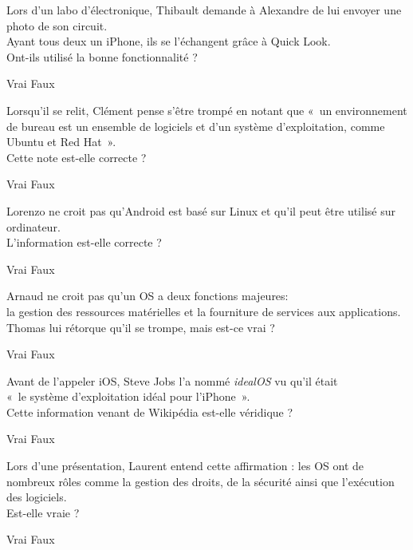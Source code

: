 \documentclass[12pt, a4paper]{exam}
\begin{document}
\begin{questions}
    \question Lors d’un labo d’électronique, Thibault demande à Alexandre de lui
    envoyer une photo de son circuit. \\
    Ayant tous deux un iPhone, ils se l’échangent grâce à Quick Look. \\
    Ont-ils utilisé la bonne fonctionnalité ?
    \begin{checkboxes}
      \choice Vrai
      \choice Faux
    \end{checkboxes}

    \clearpage

    \question Lorsqu’il se relit, Clément pense s’être trompé en notant que « un
    environnement de bureau est un ensemble de logiciels et d’un système
    d’exploitation, comme Ubuntu et Red Hat ». \\
    Cette note est-elle correcte ?
    \begin{checkboxes}
      \choice Vrai
      \choice Faux
    \end{checkboxes}

    \question Lorenzo ne croit pas qu’Android est basé sur Linux et qu’il peut
    être utilisé sur ordinateur. \\
    L’information est-elle correcte ?
    \begin{checkboxes}
      \choice Vrai
      \choice Faux
    \end{checkboxes}

    \question Arnaud ne croit pas qu’un OS a deux fonctions majeures: \\
    la gestion des ressources matérielles et la fourniture de services aux
    applications. \\
    Thomas lui rétorque qu’il se trompe, mais est-ce vrai ?
    \begin{checkboxes}
      \choice Vrai
      \choice Faux
    \end{checkboxes}

    \question Avant de l’appeler iOS, Steve Jobs l’a nommé \textit{idealOS} vu
    qu’il était \\« le système d’exploitation idéal pour l’iPhone ». \\
    Cette information venant de Wikipédia est-elle véridique ?
    \begin{checkboxes}
      \choice Vrai
      \choice Faux
    \end{checkboxes}

    \question Lors d’une présentation, Laurent entend cette affirmation : les OS
    ont de nombreux rôles comme la gestion des droits, de la sécurité ainsi que
    l’exécution des logiciels. \\
    Est-elle vraie ?
    \begin{checkboxes}
      \choice Vrai
      \choice Faux
    \end{checkboxes}


\end{questions}
\end{document}
